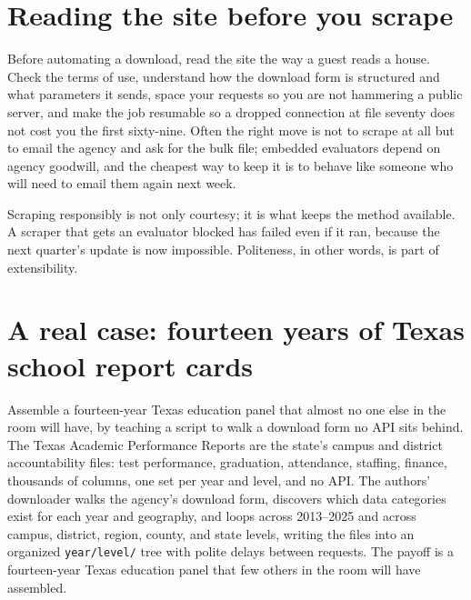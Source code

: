 \documentclass[
    a4paper,
    fontsize=10pt,
    twoside=true,
    numbers=noenddot,
]{kaobook}
\begin{document}
\section{Reading the site before you scrape}
Before automating a download, read the site the way a guest reads a house. Check the terms of use, understand how the download form is structured and what parameters it sends, space your requests so you are not hammering a public server, and make the job resumable so a dropped connection at file seventy does not cost you the first sixty-nine. Often the right move is not to scrape at all but to email the agency and ask for the bulk file; embedded evaluators depend on agency goodwill, and the cheapest way to keep it is to behave like someone who will need to email them again next week.

Scraping responsibly is not only courtesy; it is what keeps the method available. A scraper that gets an evaluator blocked has failed even if it ran, because the next quarter's update is now impossible. Politeness, in other words, is part of extensibility.

\section{A real case: fourteen years of Texas school report cards}
Assemble a fourteen-year Texas education panel that almost no one else in the room will have, by teaching a script to walk a download form no API sits behind. The Texas Academic Performance Reports are the state's campus and district accountability files: test performance, graduation, attendance, staffing, finance, thousands of columns, one set per year and level, and no API. The authors' downloader walks the agency's download form, discovers which data categories exist for each year and geography, and loops across 2013--2025 and across campus, district, region, county, and state levels, writing the files into an organized \texttt{year/level/} tree with polite delays between requests. The payoff is a fourteen-year Texas education panel that few others in the room will have assembled.
\end{document}
